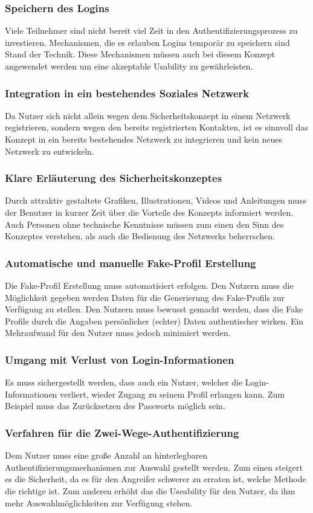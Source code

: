 \documentclass{sigchi}
\begin{document}
\subsubsection{Speichern des Logins}
Viele Teilnehmer sind nicht bereit viel Zeit in den Authentifizierungsprozess zu investieren. Mechanismen, die es erlauben Logins temporär zu speichern sind Stand der Technik. Diese Mechanismen müssen auch bei diesem Konzept angewendet werden um eine akzeptable Usability zu gewährleisten.

\subsubsection{Integration in ein bestehendes Soziales Netzwerk}
Da Nutzer sich nicht allein wegen dem Sicherheitskonzept in einem Netzwerk registrieren, sondern wegen den bereits registrierten Kontakten, ist es sinnvoll das Konzept in ein bereits bestehendes Netzwerk zu integrieren und kein neues Netzwerk zu entwickeln.
\subsubsection{Klare Erläuterung des Sicherheitskonzeptes}
Durch attraktiv gestaltete Grafiken, Illustrationen, Videos und Anleitungen muss der Benutzer in kurzer Zeit über die Vorteile des Konzepts informiert werden. Auch Personen ohne technische Kenntnisse müssen zum einen den Sinn des Konzeptes verstehen, als auch die Bedienung des Netzwerks beherrschen.
\subsubsection{Automatische und manuelle Fake-Profil Erstellung}
Die Fake-Profil Erstellung muss automatisiert erfolgen. Den Nutzern muss die Möglichkeit gegeben werden Daten für die Generierung des Fake-Profils zur Verfügung zu stellen. Den Nutzern muss bewusst gemacht werden, dass die Fake Profile durch die Angaben persönlicher (echter) Daten authentischer wirken. Ein Mehraufwand für den Nutzer muss jedoch minimiert werden.
\subsubsection{Umgang mit Verlust von Login-Informationen}
Es muss sichergestellt werden, dass auch ein Nutzer, welcher die Login-Informationen verliert, wieder Zugang zu seinem Profil erlangen kann. Zum Beispiel muss das Zurücksetzen des Passworts möglich sein.
\subsubsection{Verfahren für die Zwei-Wege-Authentifizierung}
Dem Nutzer muss eine große Anzahl an hinterlegbaren Authentifizierungsmechanismen zur Auswahl gestellt werden. Zum einen steigert es die Sicherheit, da  es für den Angreifer schwerer zu erraten ist, welche Methode die richtige ist. Zum anderen erhöht das die Useability für den Nutzer, da ihm mehr Auswahlmöglichkeiten zur Verfügung stehen.
\end{document}
